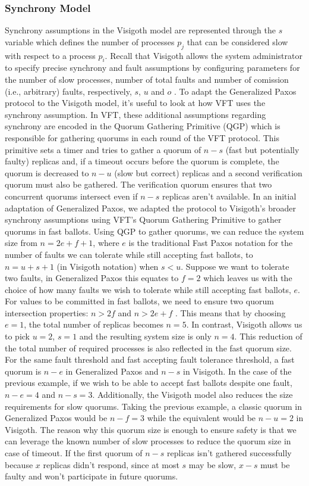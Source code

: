 \subsubsection{Synchrony Model}
Synchrony assumptions in the Visigoth model are represented through the $s$ variable which defines the number of processes $p_j$ that can be considered slow with respect to a process $p_i$. Recall that Visigoth allows the system administrator to specify precise synchrony and fault assumptions by configuring parameters for the number of slow processes, number of total faults and number of comission (i.e., arbitrary) faults, respectively, $s$, $u$ and $o$ \cite{Porto2015}. To adapt the Generalized Paxos protocol to the Visigoth model, it's useful to look at how VFT uses the synchrony assumption. In VFT, these additional assumptions regarding synchrony are encoded in the Quorum Gathering Primitive (QGP) which is responsible for gathering quorums in each round of the VFT protocol. This primitive sets a timer and tries to gather a quorum of $n-s$ (fast but potentially faulty) replicas  and, if a timeout occurs before the quorum is complete, the quorum is decreased to $n-u$ (slow but correct) replicas and a second verification quorum must also be gathered. The verification quorum ensures that two concurrent quorums intersect even if $n-s$ replicas aren't available. In an initial adaptation of Generalized Paxos, we adapted the protocol to Visigoth's broader synchrony assumptions using VFT's Quorum Gathering Primitive to gather quorums in fast ballots. Using QGP to gather quorums, we can reduce the system size from $n=2e+f+1$, where $e$ is the traditional Fast Paxos notation for the number of faults we can tolerate while still accepting fast ballots, to $n=u+s+1$ (in Visigoth notation) when $s < u$. Suppose we want to tolerate two faults, in Generalized Paxos this equates to $f=2$ which leaves us with the choice of how many faults we wish to tolerate while still accepting fast ballots, $e$. For values to be committed in fast ballots, we need to ensure two quorum intersection properties: $n > 2f$ and $n > 2e+f$ \cite{Lamport2006}. This means that by choosing $e=1$, the total number of replicas becomes $n= 5$. In contrast, Visigoth allows us to pick $u = 2$, $s = 1$ and the resulting system size is only $n = 4$. This reduction of the total number of required processes is also reflected in the fast quorum size. For the same fault threshold and fast accepting fault tolerance threshold, a fast quorum is $n-e$ in Generalized Paxos and $n-s$ in Visigoth. In the case of the previous example, if we wish to be able to accept fast ballots despite one fault, $n-e = 4$ and $n-s=3$. Additionally, the Visigoth model also reduces the size requirements for slow quorums. Taking the previous example, a classic quorum in Generalized Paxos would be $n-f = 3$ while the equivalent would be $n-u=2$ in Visigoth. The reason why this quorum size is enough to ensure safety is that we can leverage the known number of slow processes to reduce the quorum size in case of timeout. If the first quorum of $n-s$ replicas isn't gathered successfully because $x$ replicas didn't respond, since at most $s$ may be slow, $x-s$ must be faulty and won't participate in future quorums.  